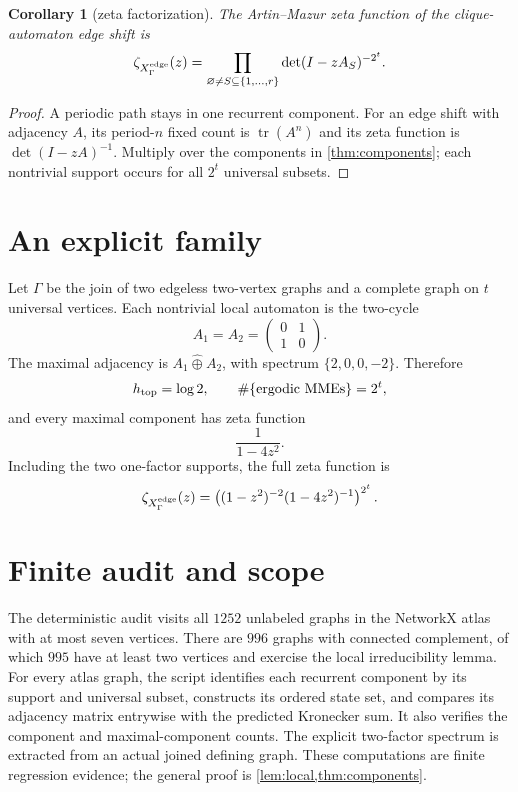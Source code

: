 \documentclass[11pt,a4paper]{amsart}
\newtheorem{corollary}[theorem]{Corollary}
\theoremstyle{definition}
\theoremstyle{remark}
\newcommand{\tr}{\operatorname{tr}}
\newcommand{\bigoplusK}{\mathbin{\widehat\oplus}}
\begin{document}
\begin{corollary}[zeta factorization]\label{cor:zeta}
The Artin--Mazur zeta function of the clique-automaton edge shift is
\begin{equation}\label{eq:zeta}
 \zeta_{X_\Gamma^{\rm edge}}(z)=
 \prod_{\varnothing\neq S\subseteq\{1,\ldots,r\}}
 \det(I-zA_S)^{-2^t}.
\end{equation}
\end{corollary}

\begin{proof}
A periodic path stays in one recurrent component.  For an edge shift with
adjacency $A$, its period-$n$ fixed count is $\tr(A^n)$ and its zeta function
is $\det(I-zA)^{-1}$.  Multiply over the components in
\cref{thm:components}; each nontrivial support occurs for all $2^t$ universal
subsets.
\end{proof}

\section{An explicit family}

Let $\Gamma$ be the join of two edgeless two-vertex graphs and a complete
graph on $t$ universal vertices.  Each nontrivial local automaton is the
two-cycle
\[
 A_1=A_2=\begin{pmatrix}0&1\\1&0\end{pmatrix}.
\]
The maximal adjacency is
$A_1\bigoplusK A_2$, with spectrum $\{2,0,0,-2\}$.  Therefore
\[
 h_{\rm top}=\log2,
 \qquad \#\{\text{ergodic MMEs}\}=2^t,
\]
and every maximal component has zeta function
\[
 \frac1{1-4z^2}.
\]
Including the two one-factor supports, the full zeta function is
\[
 \zeta_{X_\Gamma^{\rm edge}}(z)
 =\left((1-z^2)^{-2}(1-4z^2)^{-1}\right)^{2^t}.
\]

\section{Finite audit and scope}

The deterministic audit visits all $1252$ unlabeled graphs in the NetworkX
atlas with at most seven vertices.  There are $996$ graphs with connected
complement, of which $995$ have at least two vertices and exercise the local
irreducibility lemma.  For every atlas graph, the script identifies each
recurrent component by its support and universal subset, constructs its
ordered state set, and compares its adjacency matrix entrywise with the
predicted Kronecker sum.  It also verifies the component and maximal-component
counts.  The explicit two-factor spectrum is extracted from an actual joined
defining graph.  These computations are finite regression evidence; the
general proof is \cref{lem:local,thm:components}.
\end{document}
